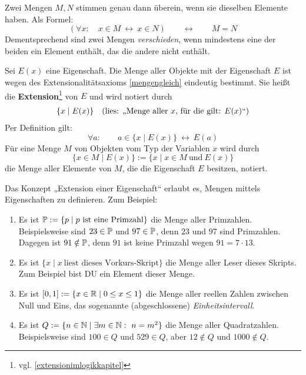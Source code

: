 \begin{axiom} \label{mengengleich} 
    Zwei Mengen $M,N$ stimmen genau dann überein, wenn sie dieselben Elemente haben. Als Formel:
        \[ (\forall x:\quad x\in M\ \leftrightarrow\ x\in N)\qquad\leftrightarrow\qquad M=N\]
    Dementsprechend sind zwei Mengen \emph{verschieden}, wenn mindestens eine der beiden ein Element enthält, das die andere nicht enthält.
\end{axiom}


\begin{de} \label{def:extension} 
    Sei $E(x)$ eine Eigenschaft. Die Menge aller Objekte mit der Eigenschaft $E$ ist wegen des Extensionalitätsaxioms \cref{mengengleich} eindeutig bestimmt. Sie heißt die \textbf{Extension}\footnote{vgl. \cref{extensionimlogikkapitel}} von $E$ und wird notiert durch
    \begin{align*}
        \{ x\mid E(x) \} && (\textnormal{lies: „Menge aller $x$, für die gilt: $E(x)$“})
    \end{align*}
    Per Definition gilt:
        \[ \forall a:\qquad a\in \{x\mid E(x)\} \ \leftrightarrow\ E(a) \]
    Für eine Menge $M$ von Objekten vom Typ der Variablen $x$ wird durch
        \[ \{ x\in M\mid E(x) \} := \{ x\mid x\in M\ \text{und}\ E(x)\} \]
    die Menge aller Elemente von $M$, die die Eigenschaft $E$ besitzen, notiert.
\end{de}


\begin{bsp} \label{bsp:extension}
    Das Konzept „Extension einer Eigenschaft“ erlaubt es, Mengen mittels Eigenschaften zu definieren. Zum Beispiel:
    \begin{enumerate}
        \item Es ist $\mathbb P := \{p\mid p\ \text{ist eine Primzahl}\}$ die Menge aller Primzahlen. Beispielsweise sind $23\in \mathbb P$ und $97\in\mathbb P$, denn $23$ und $97$ sind Primzahlen. Dagegen ist $91\notin \mathbb P$, denn $91$ ist keine Primzahl wegen $91=7\cdot 13$.
        \item Es ist $\{ x\mid x\ \text{liest dieses Vorkurs-Skript} \}$ die Menge aller Leser dieses Skripts. Zum Beispiel bist DU ein Element dieser Menge.
        \item Es ist $[0,1] := \{ x\in \mathbb R \mid 0\le x\le 1\}$ die Menge aller reellen Zahlen zwischen Null und Eins, das sogenannte (abgeschlossene) \emph{Einheitsintervall}.
        \item Es ist $Q:=\{ n\in \mathbb N \mid \exists m\in \mathbb N:\ n=m^2 \}$ die Menge aller Quadratzahlen. Beispielsweise sind $100\in Q$ und $529\in Q$, aber $12\notin Q$ und $1000\notin Q$.
    \end{enumerate}
\end{bsp}


